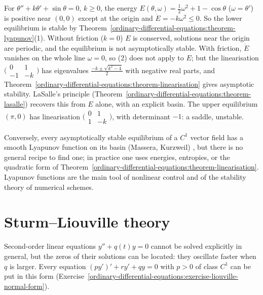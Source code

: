 \begin{example}\label{ordinary-differential-equations:example-pendulum}
For $\theta'' + k\theta' + \sin\theta = 0$, $k \geq 0$, the energy $E(\theta, \omega) = \frac12\omega^2 + 1 - \cos\theta$ ($\omega = \theta'$) is positive near $(0, 0)$ except at the origin and $\dot E = -k\omega^2 \leq 0$. So the lower equilibrium is stable
by Theorem~\ref{ordinary-differential-equations:theorem-lyapunov}(1). Without friction ($k = 0$) $E$ is conserved, solutions near the origin are periodic, and the equilibrium is not asymptotically stable. With friction, $\dot E$
vanishes on the whole line $\omega = 0$, so (2) does not apply to $E$; but the linearisation $\bigl(\begin{smallmatrix}0 & 1\\ -1 & -k\end{smallmatrix}\bigr)$ has eigenvalues $\frac{-k \pm \sqrt{k^2 - 4}}{2}$ with negative real parts, and
Theorem~\ref{ordinary-differential-equations:theorem-linearisation} gives asymptotic stability. LaSalle's principle (Theorem~\ref{ordinary-differential-equations:theorem-lasalle}) recovers this from $E$ alone, with an explicit basin. The upper
equilibrium $(\pi, 0)$ has linearisation $\bigl(\begin{smallmatrix}0 & 1\\ 1 & -k\end{smallmatrix}\bigr)$, with determinant $-1$: a saddle, unstable.
\end{example}

\begin{remark}\label{ordinary-differential-equations:remark-converse-lyapunov}
Conversely, every asymptotically stable equilibrium of a $C^1$ vector field has a smooth Lyapunov function on its basin (Massera, Kurzweil) \cite{hahn-stability}, but there is no general recipe to find one; in practice one uses
energies, entropies, or the quadratic form of Theorem~\ref{ordinary-differential-equations:theorem-linearisation}. Lyapunov functions are the main tool of nonlinear control and of the stability theory of numerical schemes.
\end{remark}

\section{Sturm--Liouville theory}\label{ordinary-differential-equations:section-sturm-liouville}

Second-order linear equations $y'' + q(t)y = 0$ cannot be solved explicitly in general, but the zeros of their solutions can be located: they oscillate faster when $q$ is larger. Every equation $(py')' + ry' + qy = 0$ with $p > 0$
of class $C^1$ can be put in this form (Exercise~\ref{ordinary-differential-equations:exercise-liouville-normal-form}).

